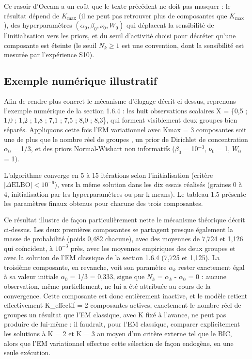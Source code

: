 Ce rasoir d'Occam a un coût que le texte précédent ne doit pas masquer : le résultat dépend de $K_{\max}$ (il ne peut pas retrouver plus de composantes que $K_{\max}$), des hyperparamètres $(\alpha_0, \beta_0, \nu_0, W_0)$ qui déplacent la sensibilité de l'initialisation vers les priors, et du seuil d'activité choisi pour décréter qu'une composante est éteinte (le seuil $N_k \geq 1$ est une convention, dont la sensibilité est mesurée par l'expérience S10).

\subsection{Exemple numérique illustratif}
Afin de rendre plus concret le mécanisme d'élagage décrit ci-dessus, reprenons l'exemple numérique de la section 1.6.4 : les huit observations scalaires X = \{0,5 ; 1,0 ; 1,2 ; 1,8 ; 7,1 ; 7,5 ; 8,0 ; 8,3\}, qui forment visiblement deux groupes bien séparés. Appliquons cette fois l'EM variationnel avec Kmax = 3 composantes  soit une de plus que le nombre réel de groupes , un prior de Dirichlet de concentration $\alpha _{0}$ = 1/3, et des priors Normal-Wishart non informatifs ($\beta _{0}$ = 10$^{-3}$, $\nu _{0}$ = 1, $W_{0}$ = 1).

L'algorithme converge en 5 à 15 itérations selon l'initialisation (critère $|\Delta \mathrm{ELBO}| < 10^{-6}$), vers la même solution dans les dix essais réalisés (graines 0 à 4, initialisation par les hyperparamètres ou par k-means). Le tableau 1.5 présente les paramètres finaux obtenus pour chacune des trois composantes.

Ce résultat illustre de façon particulièrement nette le mécanisme théorique décrit ci-dessus. Les deux premières composantes se partagent presque également la masse de probabilité (poids 0,482 chacune), avec des moyennes de 7,724 et 1,126 qui coïncident, à $10^{-3}$ près, avec les moyennes empiriques des deux groupes et avec la solution de l'EM classique de la section 1.6.4 (7,725 et 1,125). La troisième composante, en revanche, voit son paramètre $\alpha _{k}$ rester exactement égal à sa valeur initiale $\alpha _{0}$ = 1/3 = 0,333, signe que $N_{k}$ = $\alpha _{k}$ - $\alpha _{0}$ = 0 : aucune observation, même partiellement, ne lui a été attribuée au cours de la convergence. Cette composante est donc entièrement inactive, et le modèle retient effectivement K\_effectif = 2 composantes actives, exactement le nombre réel de groupes  un résultat que l'EM classique, avec K fixé à l'avance, ne peut pas produire de lui-même : il faudrait, pour l'EM classique, comparer explicitement les solutions à K = 2 et K = 3 au moyen d'un critère externe tel que le BIC, alors que l'EM variationnel effectue cette sélection de façon endogène, en une seule exécution.

